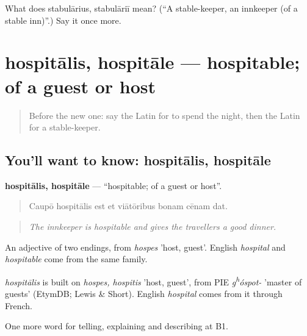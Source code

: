 \begin{tcolorbox}[breakable,colback=teal!4,colframe=teal!35!black,title={Before you move on}]
What does stabulārius, stabulāriī mean? (\textquotedblleft{}A stable-keeper, an innkeeper (of a stable inn)\textquotedblright{}.) Say it once more.
\end{tcolorbox}
\section[hospitālis, hospitāle]{hospitālis, hospitāle — hospitable; of a guest or host}

\label{lesson:LA-C445-hospitalis}



\begin{quote}
Before the new one: say the Latin for to spend the night, then the Latin for a stable-keeper.
\end{quote}

\subsection*{You'll want to know: hospitālis, hospitāle}
\textbf{hospitālis, hospitāle} — \textquotedblleft{}hospitable; of a guest or host\textquotedblright{}.

\begin{quote}
Caupō hospitālis est et viātōribus bonam cēnam dat.
\end{quote}

\begin{quote}
\emph{The innkeeper is hospitable and gives the travellers a good dinner.}
\end{quote}

An adjective of two endings, from \emph{hospes} 'host, guest'. English \emph{hospital} and \emph{hospitable} come from the same family.

\begin{cousinweb}
\emph{hospitālis} is built on \emph{hospes, hospitis} 'host, guest', from PIE \emph{g\textsuperscript{h}óspot-} 'master of guests' (EtymDB; Lewis \& Short). English \emph{hospital} comes from it through French.
\end{cousinweb}

\begin{grammarlens}[title={What you've built}]
One more word for telling, explaining and describing at B1.
\end{grammarlens}

